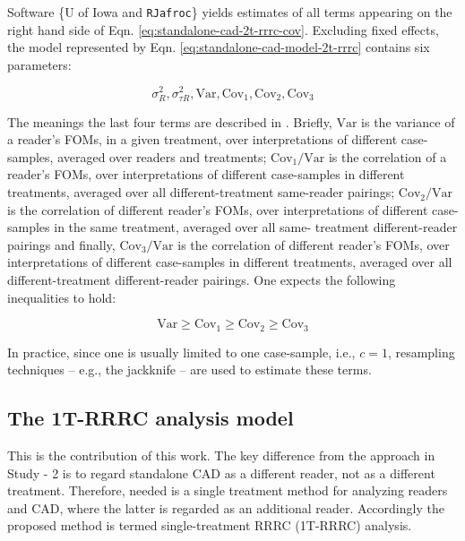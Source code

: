 \documentclass[
]{book}
\begin{document}
Software \{U of Iowa and \texttt{RJafroc}\} yields estimates of all terms appearing on the right hand side of Eqn. \eqref{eq:standalone-cad-2t-rrrc-cov}. Excluding fixed effects, the model represented by Eqn. \eqref{eq:standalone-cad-model-2t-rrrc} contains six parameters:

\begin{equation}
\sigma_R^2, \sigma_{\tau R}^2, \text{Var}, \text{Cov}_1, \text{Cov}_2, \text{Cov}_3
\label{eq:standalone-cad-2t-rrrc-varcom}
\end{equation}

The meanings the last four terms are described in \citep{hillis2007comparison, obuchowski1995hypothesis, hillis2005comparison, chakraborty2017observer}. Briefly, \(\text{Var}\) is the variance of a reader's FOMs, in a given treatment, over interpretations of different case-samples, averaged over readers and treatments; \(\text{Cov}_1/\text{Var}\) is the correlation of a reader's FOMs, over interpretations of different case-samples in different treatments, averaged over all different-treatment same-reader pairings; \(\text{Cov}_2/\text{Var}\) is the correlation of different reader's FOMs, over interpretations of different case-samples in the same treatment, averaged over all same- treatment different-reader pairings and finally, \(\text{Cov}_3/\text{Var}\) is the correlation of different reader's FOMs, over interpretations of different case-samples in different treatments, averaged over all different-treatment different-reader pairings. One expects the following inequalities to hold:

\begin{equation}
\text{Var} \geq \text{Cov}_1 \geq \text{Cov}_2 \geq \text{Cov}_3
\label{eq:standalone-cad-2t-rrrc-varcom-ordering}
\end{equation}

In practice, since one is usually limited to one case-sample, i.e., \(c = 1\), resampling techniques \citep{efron1994introduction} -- e.g., the jackknife -- are used to estimate these terms.

\hypertarget{standalone-cad-radiologists-1TRRRC-anlaysis}{%
\subsection{The 1T-RRRC analysis model}\label{standalone-cad-radiologists-1TRRRC-anlaysis}}

This is the contribution of this work. The key difference from the approach in Study - 2 is to regard standalone CAD as a different reader, not as a different treatment. Therefore, needed is a single treatment method for analyzing readers and CAD, where the latter is regarded as an additional reader. Accordingly the proposed method is termed single-treatment RRRC (1T-RRRC) analysis.
\end{document}
